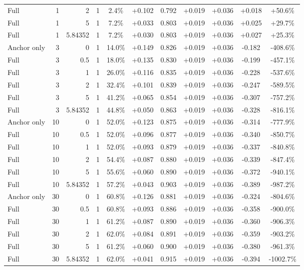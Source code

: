 \begin{table}[htbp]
\begin{tabular}{lrrrccccccc}
Full & 1 & 2 & 1 & 2.4\% & +0.102 & 0.792 & +0.019 & +0.036 & +0.018 & +50.6\% \\
Full & 1 & 5 & 1 & 7.2\% & +0.033 & 0.803 & +0.019 & +0.036 & +0.025 & +29.7\% \\
Full & 1 & 5.84352 & 1 & 7.2\% & +0.030 & 0.803 & +0.019 & +0.036 & +0.027 & +25.3\% \\
Anchor only & 3 & 0 & 1 & 14.0\% & +0.149 & 0.826 & +0.019 & +0.036 & -0.182 & -408.6\% \\
Full & 3 & 0.5 & 1 & 18.0\% & +0.135 & 0.830 & +0.019 & +0.036 & -0.199 & -457.1\% \\
Full & 3 & 1 & 1 & 26.0\% & +0.116 & 0.835 & +0.019 & +0.036 & -0.228 & -537.6\% \\
Full & 3 & 2 & 1 & 32.4\% & +0.101 & 0.839 & +0.019 & +0.036 & -0.247 & -589.5\% \\
Full & 3 & 5 & 1 & 41.2\% & +0.065 & 0.854 & +0.019 & +0.036 & -0.307 & -757.2\% \\
Full & 3 & 5.84352 & 1 & 44.8\% & +0.050 & 0.863 & +0.019 & +0.036 & -0.328 & -816.1\% \\
Anchor only & 10 & 0 & 1 & 52.0\% & +0.123 & 0.875 & +0.019 & +0.036 & -0.314 & -777.9\% \\
Full & 10 & 0.5 & 1 & 52.0\% & +0.096 & 0.877 & +0.019 & +0.036 & -0.340 & -850.7\% \\
Full & 10 & 1 & 1 & 52.0\% & +0.093 & 0.879 & +0.019 & +0.036 & -0.337 & -840.8\% \\
Full & 10 & 2 & 1 & 54.4\% & +0.087 & 0.880 & +0.019 & +0.036 & -0.339 & -847.4\% \\
Full & 10 & 5 & 1 & 55.6\% & +0.060 & 0.890 & +0.019 & +0.036 & -0.372 & -940.1\% \\
Full & 10 & 5.84352 & 1 & 57.2\% & +0.043 & 0.903 & +0.019 & +0.036 & -0.389 & -987.2\% \\
Anchor only & 30 & 0 & 1 & 60.8\% & +0.126 & 0.881 & +0.019 & +0.036 & -0.324 & -804.6\% \\
Full & 30 & 0.5 & 1 & 60.8\% & +0.093 & 0.886 & +0.019 & +0.036 & -0.358 & -900.0\% \\
Full & 30 & 1 & 1 & 61.2\% & +0.087 & 0.890 & +0.019 & +0.036 & -0.360 & -906.3\% \\
Full & 30 & 2 & 1 & 62.0\% & +0.084 & 0.891 & +0.019 & +0.036 & -0.359 & -903.2\% \\
Full & 30 & 5 & 1 & 61.2\% & +0.060 & 0.900 & +0.019 & +0.036 & -0.380 & -961.3\% \\
Full & 30 & 5.84352 & 1 & 62.0\% & +0.041 & 0.915 & +0.019 & +0.036 & -0.394 & -1002.7\% \\

\end{tabular}
\end{table}
